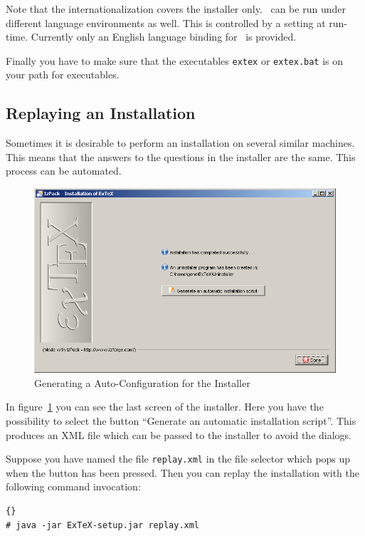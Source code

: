 \documentclass{extex-doc}
\newcommand\Prog[1]{\texttt{#1}\index{#1}}
\begin{document}
Note that the internationalization covers the installer only. \ExTeX\
can be run under different language environments as well. This is
controlled by a setting at run-time. Currently only an English
language binding for \ExTeX\ is provided.

Finally you have to make sure that the executables \Prog{extex} or
\Prog{extex.bat} is on your path for executables.\index{path}


\subsection{Replaying an Installation}

Sometimes it is desirable to perform an installation on several
similar machines. This means that the answers to the questions in the
installer are the same. This process can be automated.
\begin{figure}[tp]
  \centering
  \includegraphics[width=.8\textwidth]{img/inst8}
  \caption{Generating a Auto-Configuration for the Installer}
  \label{fig:inst8}
\end{figure}

In figure~\ref{fig:inst8} you can see the last screen of the
installer. Here you have the possibility to select the button
``Generate an automatic installation script''. This produces an XML
file which can be passed to the installer to avoid the
dialogs.

Suppose you have named the file \texttt{replay.xml} in the file
selector which pops up when the button has been pressed. Then you can
replay the installation with the following command invocation:

\begin{lstlisting}{}
# java -jar ExTeX-setup.jar replay.xml
\end{lstlisting}
\end{document}
